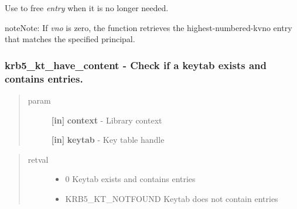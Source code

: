 \documentclass[letterpaper,10pt,english]{sphinxmanual}
\begin{document}
Use {\hyperref[appdev/refs/api/krb5_free_keytab_entry_contents:c.krb5_free_keytab_entry_contents]{}} to free \emph{entry} when it is no longer needed.

\begin{notice}{note}{Note:}
If \emph{vno} is zero, the function retrieves the highest-numbered-kvno entry that matches the specified principal.
\end{notice}


\subsubsection{krb5\_kt\_have\_content -  Check if a keytab exists and contains entries.}
\label{appdev/refs/api/krb5_kt_have_content::doc}\label{appdev/refs/api/krb5_kt_have_content:krb5-kt-have-content-check-if-a-keytab-exists-and-contains-entries}

\begin{fulllineitems}
\label{appdev/refs/api/krb5_kt_have_content:c.krb5_kt_have_content}
\end{fulllineitems}

\begin{quote}\begin{description}
\item[{param}] \leavevmode
\textbf{{[}in{]}} \textbf{context} - Library context

\textbf{{[}in{]}} \textbf{keytab} - Key table handle

\end{description}\end{quote}
\begin{quote}\begin{description}
\item[{retval}] \leavevmode\begin{itemize}
\item {} 
0   Keytab exists and contains entries

\item {} 
KRB5\_KT\_NOTFOUND   Keytab does not contain entries

\end{itemize}

\end{description}\end{quote}
\end{document}
